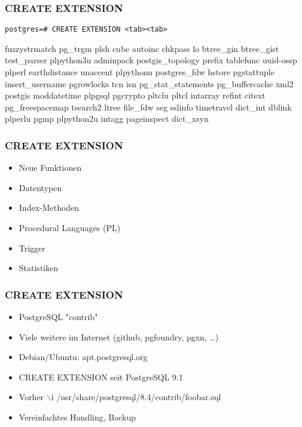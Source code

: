 \documentclass[utf8,hyperref={pdftex,colorlinks,linkcolor=black,citecolor=black,urlcolor=black,filecolor=black,plainpages=false},xcolor=table,hyperref]{beamer}
\begin{document}

%
%
%

\begin{frame}[containsverbatim]
	\frametitle{CREATE EXTENSION}
	\verb|postgres=# CREATE EXTENSION <tab><tab>|

fuzzystrmatch pg_trgm plsh cube autoinc chkpass lo btree_gin btree_gist
test_parser plpython3u adminpack postgis_topology prefix
tablefunc uuid-ossp plperl earthdistance unaccent plpythonu postgres_fdw hstore
pgstattuple insert_username pgrowlocks tcn isn pg_stat_statements
pg_buffercache xml2 postgis moddatetime plpgsql pgcrypto pltclu pltcl intarray
refint citext pg_freespacemap tsearch2 ltree file_fdw seg sslinfo timetravel
dict_int dblink plperlu pgmp plpython2u intagg pageinspect dict_xsyn
\end{frame}


\begin{frame}
	\frametitle{CREATE EXTENSION}
	\begin{itemize}
		\item Neue Funktionen
		\item Datentypen
		\item Index-Methoden
		\item Procedural Languages (PL)
		\item Trigger
		\item Statistiken
	\end{itemize}
\end{frame}


\begin{frame}
	\frametitle{CREATE EXTENSION}
	\begin{itemize}
		\item PostgreSQL "contrib"
		\item Viele weitere im Internet (github, pgfoundry, pgxn, \dots)
		\item Debian/Ubuntu: apt.postgresql.org
		\item CREATE EXTENSION seit PostgreSQL 9.1
		\item Vorher $\backslash$i /usr/share/postgresql/8.4/contrib/foobar.sql
		\item Vereinfachtes Handling, Backup
	\end{itemize}
\end{frame}
\end{document}
